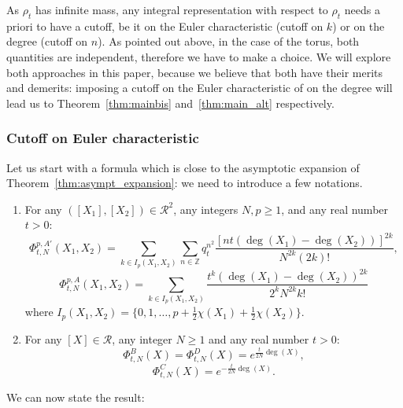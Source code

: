 \documentclass[11pt,a4paper,reqno]{article}
\theoremstyle{definition}
\theoremstyle{remark}
\newcommand\Z{{\mathbb Z}}
\begin{document}
As $\rho_t$ has infinite mass, any integral representation with respect to $\rho_t$ needs a priori to have a cutoff, be it on the Euler characteristic (cutoff on $k$) or on the degree (cutoff on $n$). As pointed out above, in the case of the torus, both quantities are independent, therefore we have to make a choice. We will explore both approaches in this paper, because we believe that both have their merits and demerits: imposing a cutoff on the Euler characteristic of on the degree will lead us to Theorem~\ref{thm:mainbis} and~\ref{thm:main_alt} respectively.

\subsubsection{Cutoff on  Euler characteristic}

Let us start with a formula which is close to the asymptotic expansion of Theorem~\ref{thm:asympt_expansion}: we need to introduce a few notations.
\begin{enumerate}
\item For any $([X_1],[X_2])\in \mathcal{R}^2$, any integers $N,p\geq 1$, and any real number $t>0$:
\begin{equation}\label{eq:Phi_Aprime}
\Phi_{t,N}^{p,A'}(X_1,X_2)=\sum_{k\in I_p(X_1,X_2)}\sum_{n\in\Z}q_t^{n^2}\frac{[nt(\deg(X_1)-\deg(X_2))]^{2k}}{N^{2k}(2k)!},
\end{equation}
\begin{equation}\label{eq:Phi_A}
\Phi_{t,N}^{p,A}(X_1,X_2)=\sum_{k\in I_p(X_1,X_2)}\frac{t^k(\deg(X_1)-\deg(X_2))^{2k}}{2^{k}N^{2k}k!}
\end{equation}
where $I_p(X_1,X_2)=\{0,1,\ldots, p+\frac12\chi(X_1)+\frac12\chi(X_2)\}$.\\
\item For any $[X]\in \mathcal{R}$, any integer $N\geq 1$ and any real number $t>0$:
\begin{equation}\label{eq:Phi_BD}
\Phi_{t,N}^{B}(X)=\Phi_{t,N}^{D}(X)=e^{\frac{t}{2N}\deg(X)},
\end{equation}
\begin{equation}\label{eq:Phi_C}
\Phi_{t,N}^{C}(X)=e^{-\frac{t}{2N}\deg(X)}.
\end{equation}
\end{enumerate}
We can now state the result:
\end{document}
